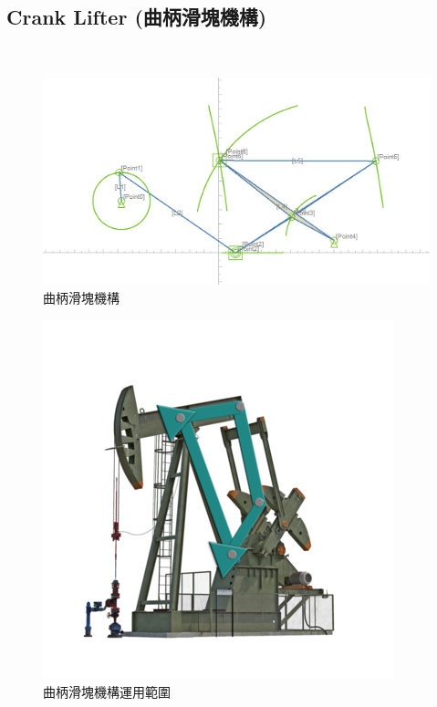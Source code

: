 \documentclass[14pt,a4paper]{report}  %
\newcommand{\fourteen}{\fontsize{14pt}{\baselineskip}\selectfont}%
\begin{document}
{		\subsection{Crank Lifter (曲柄滑塊機構)}
       \hspace*{\fill} \\
       \fourteen {主要以6個連桿、7個接頭，4個雙接頭連桿、1個三接頭連桿所構成，如圖(3.1)，由四連桿機構衍伸而來多樣性運動型態、軌跡，可滿足一般運動需求，常用於汽車工業中加速與製動，從踏板的輸入到化油器、製動缸、自行車剎車都廣泛運用在其中，如圖(3.2)。}
     \begin{figure}[H]
        \centering
        \includegraphics[scale=0.5]{曲柄滑塊機構.png} 
        \caption{曲柄滑塊機構} %
        \label{fig:scale} %
    \end{figure}
    \begin{figure}[H]
        \centering
        \includegraphics[scale=0.6]{曲柄滑塊機構運用範圍.png} 
        \caption{曲柄滑塊機構運用範圍} %
        \label{fig:scale} %
    \end{figure}
    
}
\end{document}
